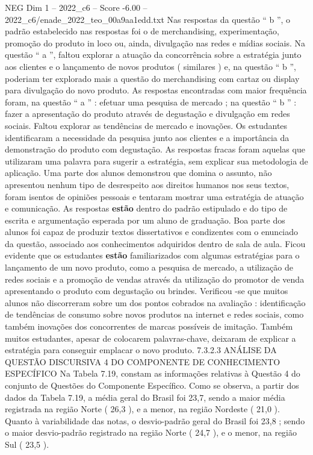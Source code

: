 \begin{textsample}{NEG Dim 1 – 2022\_c6 – Score -6.00 – 2022\_c6/enade\_2022\_teo\_00a9aa1edd.txt}
Nas respostas da questão “ b ”, o padrão estabelecido nas respostas foi o de merchandising, experimentação, promoção do produto in loco ou, ainda, divulgação nas redes e mídias sociais.
Na questão “ a ”, faltou explorar a atuação da concorrência sobre a estratégia junto aos clientes e o lançamento de novos produtos ( similares ) e, na questão “ b ”, poderiam ter explorado mais a questão do merchandising com cartaz ou display para divulgação do novo produto.
As respostas encontradas com maior frequência foram, na questão “ a ” : efetuar uma pesquisa de mercado ; na questão “ b ” : fazer a apresentação do produto através de degustação e divulgação em redes sociais.
Faltou explorar as tendências de mercado e inovações.
Os estudantes identificaram a necessidade da pesquisa junto aos clientes e a importância da demonstração do produto com degustação.
As respostas fracas foram aquelas que utilizaram uma palavra para sugerir a estratégia, sem explicar sua metodologia de aplicação.
Uma parte dos alunos demonstrou que domina o assunto, não apresentou nenhum tipo de desrespeito aos direitos humanos nos seus textos, foram isentos de opiniões pessoais e tentaram mostrar uma estratégia de atuação e comunicação.
As respostas \textbf{estão} dentro do padrão estipulado e do tipo de escrita e argumentação esperada por um aluno de graduação.
Boa parte dos alunos foi capaz de produzir textos dissertativos e condizentes com o enunciado da questão, associado aos conhecimentos adquiridos dentro de sala de aula.
Ficou evidente que os estudantes \textbf{estão} familiarizados com algumas estratégias para o lançamento de um novo produto, como a pesquisa de mercado, a utilização de redes sociais e a promoção de vendas através da utilização do promotor de venda apresentando o produto com degustação ou brindes.
Verificou -se que muitos alunos não discorreram sobre um dos pontos cobrados na avaliação : identificação de tendências de consumo sobre novos produtos na internet e redes sociais, como também inovações dos concorrentes de marcas possíveis de imitação.
Também muitos estudantes, apesar de colocarem palavras-chave, deixaram de explicar a estratégia para conseguir emplacar o novo produto. 7.3.2.3 ANÁLISE DA QUESTÃO DISCURSIVA 4 DO COMPONENTE DE CONHECIMENTO ESPECÍFICO Na Tabela 7.19, constam as informações relativas à Questão 4 do conjunto de Questões do Componente Específico.
Como se observa, a partir dos dados da Tabela 7.19, a média geral do Brasil foi 23,7, sendo a maior média registrada na região Norte ( 26,3 ), e a menor, na região Nordeste ( 21,0 ).
Quanto à variabilidade das notas, o desvio-padrão geral do Brasil foi 23,8 ; sendo o maior desvio-padrão registrado na região Norte ( 24,7 ), e o menor, na região Sul ( 23,5 ).

\end{textsample}
